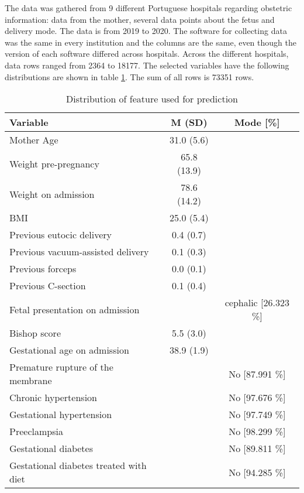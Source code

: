 The data was gathered from 9 different Portuguese hospitals regarding obstetric information: data from the mother, several data points about the fetus and delivery mode. The data is from 2019 to 2020. The software for collecting data was the same in every institution and the columns are the same, even though the version of each software differed across hospitals. Across the different hospitals, data rows ranged from 2364 to 18177. The selected variables have the following distributions are shown in table \ref{tab:obs_material_1}. The sum of all rows is 73351 rows. 
\begin{table}[htbp]
  \centering
  \caption{Distribution of feature used for prediction}
  \label{tab:obs_material_1}
   \renewcommand{\arraystretch}{1.02} %
  \setlength{\tabcolsep}{12pt} %
    \begin{tabular}{m{15em}cc}
    \toprule
        Variable & M (SD) & Mode [\%] \\ 
        \hline
        Mother Age & 31.0 (5.6) & ~ \\ 
        Weight pre-pregnancy & 65.8 (13.9) & ~ \\ 
        Weight on admission & 78.6 (14.2) & ~ \\ 
        BMI & 25.0 (5.4) & ~ \\ 
        Previous eutocic delivery & 0.4 (0.7) & ~ \\ 
        Previous vacuum-assisted delivery & 0.1 (0.3) & ~ \\ 
        Previous forceps & 0.0 (0.1) & ~ \\ 
        Previous C-section & 0.1 (0.4) & ~ \\ 
        Fetal presentation on admission & ~ & cephalic [26.323 \%] \\ 
        Bishop score & 5.5 (3.0) & ~ \\ 
        Gestational age on admission & 38.9 (1.9) & ~ \\ 
        Premature rupture of the membrane & ~ & No [87.991 \%] \\ 
        Chronic hypertension & ~ & No [97.676 \%] \\ 
        Gestational hypertension & ~ & No [97.749 \%] \\ 
        Preeclampsia & ~ & No [98.299 \%] \\ 
        Gestational diabetes & ~ & No [89.811 \%] \\ 
        Gestational diabetes treated with diet & ~ & No [94.285 \%] \\ 

\end{tabular}
\end{table}
